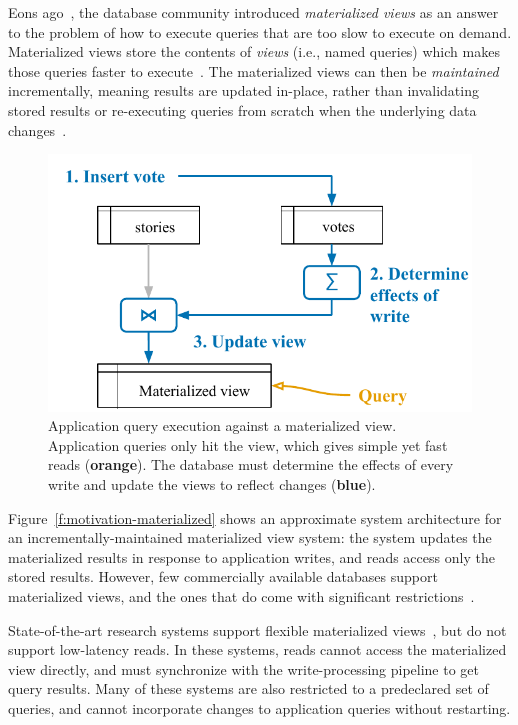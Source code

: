 
Eons ago~\cite{relational-materialized-views,stonebraker-views}, the database
community introduced \textit{materialized views} as an answer to the problem of
how to execute queries that are too slow to execute on demand. Materialized
views store the contents of \textit{views} (i.e., named queries) which makes
those queries faster to execute~\cite{materialized-views}. The materialized
views can then be \textit{maintained} incrementally, meaning results are updated
in-place, rather than invalidating stored results or re-executing queries from
scratch when the underlying data changes~\cite{materialized-survey}.

\begin{figure}
  \centering
  \includegraphics{diagrams/Motivation Materialized Views.pdf}
  \caption{Application query execution against a materialized view. Application
  queries only hit the view, which gives simple yet fast reads
  (\textbf{\color{set2}orange}). The database must determine the effects of
  every write and update the views to reflect changes
  (\textbf{\color{set1}blue}).}
  \label{f:motivation-materialized}
\end{figure}

Figure~\vref{f:motivation-materialized} shows an approximate system architecture
for an incrementally-maintained materialized view system: the system updates the
materialized results in response to application writes, and reads access only
the stored results. However, few commercially available databases support
materialized views, and the ones that do come with significant
restrictions~\cite{mssql-materialized-view-restrictions}.

State-of-the-art research systems support flexible materialized
views~\cite{dbtoaster,materialize}, but do not support low-latency reads. In
these systems, reads cannot access the materialized view directly, and must
synchronize with the write-processing pipeline to get query results. Many of
these systems are also restricted to a predeclared set of queries, and cannot
incorporate changes to application queries without restarting.


